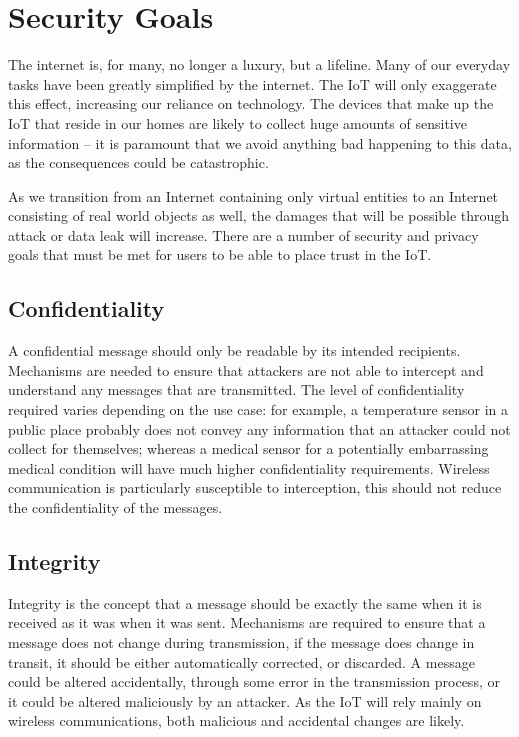 \documentclass[10pt,journal,compsoc]{IEEEtran}
\begin{document}
\section{Security Goals}
The internet is, for many, no longer a luxury, but a lifeline. Many of our
everyday tasks have been greatly simplified by the internet. The IoT will only
exaggerate this effect, increasing our reliance on technology. The devices that
make up the IoT that reside in our homes are likely to collect huge amounts of
sensitive information -- it is paramount that we avoid anything bad happening to
this data, as the consequences could be catastrophic. 

As we transition from an Internet containing only virtual entities to an
Internet consisting of real world objects as well, the damages that will be
possible through attack or data leak will increase. There are a number of
security and privacy goals that must be met for users to be able to place trust
in the IoT.

\subsection{Confidentiality}
A confidential message should only be readable by its intended recipients.
Mechanisms are needed to ensure that attackers are not able to intercept and
understand any messages that are transmitted. The level of confidentiality
required varies depending on the use case: for example, a temperature sensor in
a public place probably does not convey any information that an attacker could
not collect for themselves; whereas a medical sensor for a potentially
embarrassing medical condition will have much higher confidentiality
requirements. Wireless communication is particularly susceptible to
interception, this should not reduce the confidentiality of the messages.  

\subsection{Integrity}
Integrity is the concept that a message should be exactly the same when it is
received as it was when it was sent. Mechanisms are required to ensure that a
message does not change during transmission, if the message does change in
transit, it should be either automatically corrected, or discarded. A message
could be altered accidentally, through some error in the transmission process,
or it could be altered maliciously by an attacker. As the IoT will rely mainly
on wireless communications, both malicious and accidental changes are likely. 
\end{document}
